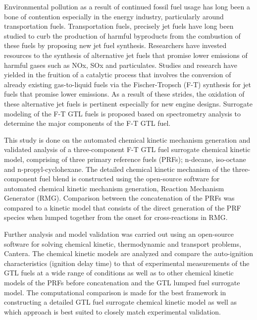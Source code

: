 \thispagestyle{plain}


    
    \justifying

             
    Environmental pollution as a result of continued fossil fuel usage has long been a bone of contention especially in the energy industry, particularly around transportation fuels. Transportation fuels, precisely jet fuels have long been studied to curb the production of harmful byproducts from the combustion of these fuels by proposing new jet fuel synthesis. Researchers have invested resources to the synthesis of alternative jet fuels that promise lower emissions of harmful gases such as NOx, SOx and particulates. Studies and research have yielded in the fruition of a catalytic process that involves the conversion of already existing gas-to-liquid fuels via the Fischer-Tropsch (F-T) synthesis for jet fuels that promise lower emissions. As a result of these strides, the oxidation of these alternative jet fuels is pertinent especially for new engine designs. Surrogate modeling of the F-T GTL fuels is proposed based on spectrometry analysis to determine the major components of the F-T GTL fuel.
    
    This study is done on the automated chemical kinetic mechanism generation and validated analysis of a three-component F-T GTL fuel surrogate chemical kinetic model, comprising of three primary reference fuels (PRFs); n-decane, iso-octane and n-propyl-cyclohexane. The detailed chemical kinetic mechanism of the three-component fuel blend is constructed using the open-source software for automated chemical kinetic mechanism generation, Reaction Mechanism Generator (RMG). Comparison between the concatenation of the PRFs was compared to a kinetic model that consists of the direct generation of the PRF species when lumped together from the onset for cross-reactions in RMG. 
    
    Further analysis and model validation was carried out using an open-source software for solving chemical kinetic, thermodynamic and transport problems, Cantera. The chemical kinetic models are analyzed and compare the auto-ignition characteristics (ignition delay time) to that of experimental measurements of the GTL fuels at a wide range of conditions as well as to other chemical kinetic models of the PRFs before concatenation and the GTL lumped fuel surrogate model. The computational comparison is made for the best framework in constructing a detailed GTL fuel surrogate chemical kinetic model as well as which approach is best suited to closely match experimental validation.
